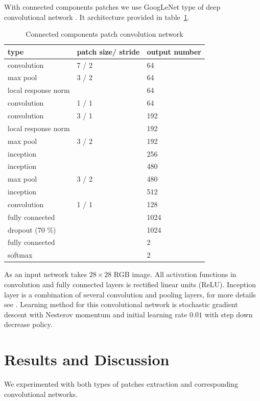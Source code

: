 \documentclass[conference,a4paper,twocolumn]{IEEEtran}
\begin{document}
With connected components patches we use GoogLeNet type of deep convolutional network \cite{Googlenet}. It architecture provided in table~\ref{googlenet_tab}. 
\begin{table}[!h]
\centering
\caption{Connected components patch convolution network}
\label{googlenet_tab}
\begin{tabular}{|l|p{1.3cm}|p{1.3cm}|}
\hline
\textbf{type} & \textbf{patch size/ stride} & \textbf{output number}  \\
\hline
convolution & 7 / 2 & 64 \\
\hline
max pool & 3 / 2 & 64 \\
\hline
local response norm & & 64 \\
\hline
convolution & 1 / 1 & 64 \\
\hline
convolution & 3 / 1 & 192 \\
\hline
local response norm & & 192 \\
\hline
max pool & 3 / 2 & 192 \\
\hline
inception &  & 256 \\
\hline
inception &  & 480 \\
\hline
max pool & 3 / 2 & 480 \\
\hline
inception &  & 512 \\
\hline
convolution & 1 / 1 & 128 \\
\hline
fully connected & & 1024 \\
\hline
dropout (70 \%) & & 1024 \\
\hline
fully connected & & 2 \\
\hline
softmax & & 2 \\
\hline
\end{tabular}
\end{table}

As an input network takes $28\times28$ RGB image. All activation functions in convolution and fully connected layers is rectified linear units (ReLU). Inception layer is a combination of several convolution and pooling layers, for more details see \cite{Googlenet}. Learning method for this convolutional network is stochastic gradient descent with Nesterov momentum and initial learning rate $0.01$ with step down decrease policy. 

\section{Results and Discussion}

We experimented with both types of patches extraction and corresponding convolutional networks. 
\end{document}
